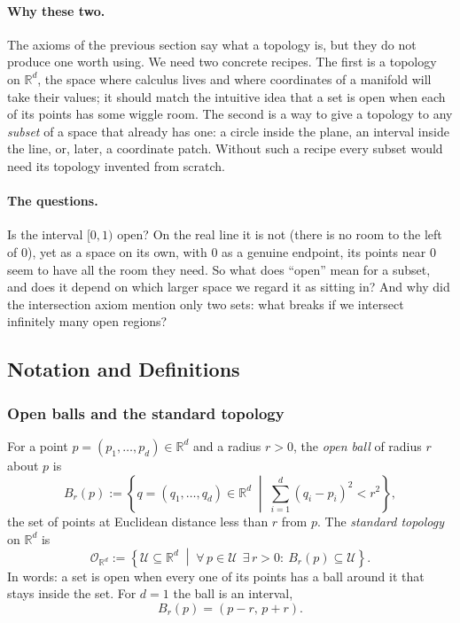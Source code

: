 \documentclass[11pt]{article}
\begin{document}
\paragraph{Why these two.}
The axioms of the previous section say what a topology is, but they do not produce one worth using. We need two concrete recipes. The first is a topology on $\mathbb R^d$, the space where calculus lives and where coordinates of a manifold will take their values; it should match the intuitive idea that a set is open when each of its points has some wiggle room. The second is a way to give a topology to any \emph{subset} of a space that already has one: a circle inside the plane, an interval inside the line, or, later, a coordinate patch. Without such a recipe every subset would need its topology invented from scratch.

\paragraph{The questions.}
Is the interval $[0,1)$ open? On the real line it is not (there is no room to the left of $0$), yet as a space on its own, with $0$ as a genuine endpoint, its points near $0$ seem to have all the room they need. So what does ``open'' mean for a subset, and does it depend on which larger space we regard it as sitting in? And why did the intersection axiom mention only two sets: what breaks if we intersect infinitely many open regions?

\subsection*{Notation and Definitions}

\subsubsection*{Open balls and the standard topology}
For a point $p=(p_1,\dots,p_d)\in\mathbb R^d$ and a radius $r>0$, the \emph{open ball} of radius $r$ about $p$ is
\[
B_r(p):=\left\{q=(q_1,\dots,q_d)\in\mathbb R^d \;\middle|\; \sum_{i=1}^d(q_i-p_i)^2<r^2\right\},
\]
the set of points at Euclidean distance less than $r$ from $p$. The \emph{standard topology} on $\mathbb R^d$ is
\[
\mathcal O_{\mathbb R^d}:=\left\{\mathcal U\subseteq\mathbb R^d \;\middle|\; \forall\,p\in\mathcal U\ \ \exists\, r>0:\ B_r(p)\subseteq\mathcal U\right\}.
\]
In words: a set is open when every one of its points has a ball around it that stays inside the set. For $d=1$ the ball is an interval,
\[
B_r(p)=(p-r,\,p+r).
\]
\end{document}
